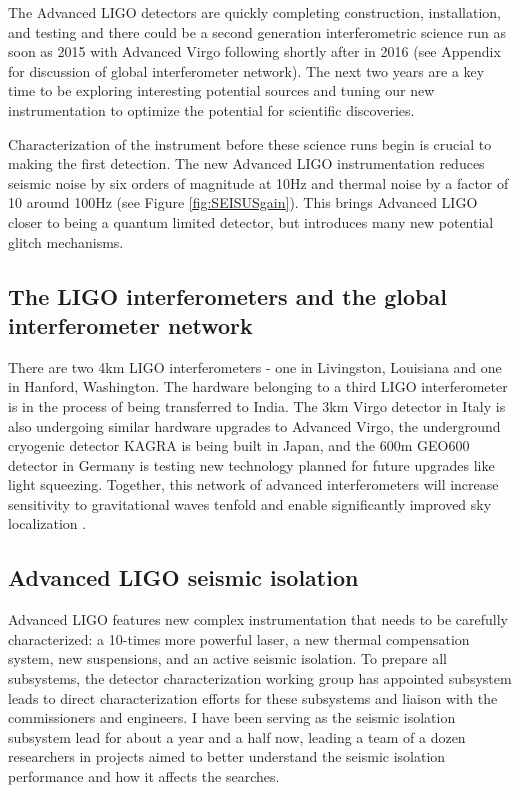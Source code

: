 The Advanced LIGO detectors are quickly completing construction, installation, and testing and there could be a second generation interferometric \gw{} science run as soon as 2015 with Advanced Virgo following shortly after in 2016 (see Appendix for discussion of global interferometer network). The next two years are a key time to be exploring interesting potential \gw{}  sources and tuning our new instrumentation to optimize the potential for scientific discoveries. 

Characterization of the instrument before these science runs begin is crucial to making the first \gw{}  detection. The new Advanced LIGO instrumentation reduces seismic noise by six orders of magnitude at 10Hz and thermal noise by a factor of 10 around 100Hz (see Figure \ref{fig:SEISUSgain}). This brings Advanced LIGO closer to being a quantum limited detector, but introduces many new potential glitch mechanisms. 


\subsection{The LIGO interferometers and the global interferometer network}

There are two 4km LIGO interferometers - one in Livingston, Louisiana and one in Hanford, Washington. The hardware belonging to a third LIGO interferometer is in the process of being transferred to India. The 3km Virgo detector in Italy is also undergoing similar hardware upgrades to Advanced Virgo, the underground cryogenic detector KAGRA is being built in Japan, and the 600m GEO600 detector in Germany is testing new technology planned for future upgrades like light squeezing. Together, this network of advanced interferometers will increase sensitivity to gravitational waves tenfold and enable significantly improved sky localization \cite{Gonzalez-GWA}. 

\subsection{Advanced LIGO seismic isolation} 

Advanced LIGO features new complex instrumentation that needs to be carefully characterized: a 10-times more powerful laser, a new thermal compensation system, new suspensions, and an active seismic isolation. To prepare all subsystems, the detector characterization working group has appointed subsystem leads to direct characterization efforts for these subsystems and liaison with the commissioners and engineers. I have been serving as the seismic isolation subsystem lead for about a year and a half now, leading a team of a dozen researchers in projects aimed to better understand the seismic isolation performance and how it affects the \gw{} searches. 

